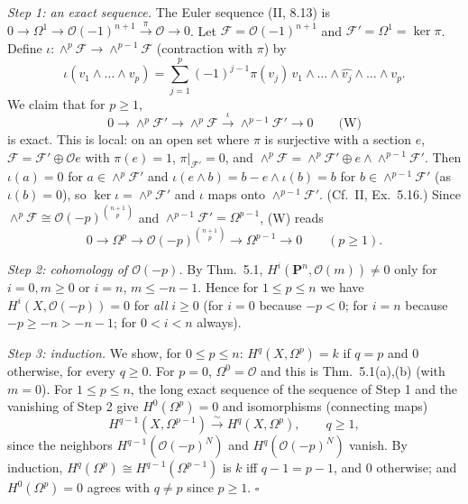 \documentclass[11pt]{article}
\begin{document}
\emph{Step 1: an exact sequence.} The Euler sequence (II, 8.13) is $0\to\Omega^1\to\mathcal O(-1)^{n+1}\xrightarrow{\pi}\mathcal O\to0$. Let $\mathcal F=\mathcal O(-1)^{n+1}$ and $\mathcal F'=\Omega^1=\ker\pi$. Define $\iota\colon\wedge^p\mathcal F\to\wedge^{p-1}\mathcal F$ (contraction with $\pi$) by
\[
\iota(v_1\wedge\dots\wedge v_p)=\sum_{j=1}^p(-1)^{j-1}\pi(v_j)\,v_1\wedge\dots\wedge\widehat{v_j}\wedge\dots\wedge v_p .
\]
We claim that for $p\ge1$,
\[
0\to\wedge^p\mathcal F'\to\wedge^p\mathcal F\xrightarrow{\ \iota\ }\wedge^{p-1}\mathcal F'\to0\qquad\text{(W)}
\]
is exact. This is local: on an open set where $\pi$ is surjective with a section $e$, $\mathcal F=\mathcal F'\oplus\mathcal O e$ with $\pi(e)=1$, $\pi|_{\mathcal F'}=0$, and $\wedge^p\mathcal F=\wedge^p\mathcal F'\oplus e\wedge\wedge^{p-1}\mathcal F'$. Then $\iota(a)=0$ for $a\in\wedge^p\mathcal F'$ and $\iota(e\wedge b)=b-e\wedge\iota(b)=b$ for $b\in\wedge^{p-1}\mathcal F'$ (as $\iota(b)=0$), so $\ker\iota=\wedge^p\mathcal F'$ and $\iota$ maps onto $\wedge^{p-1}\mathcal F'$. (Cf.\ II, Ex.~5.16.) Since $\wedge^p\mathcal F\cong\mathcal O(-p)^{\binom{n+1}{p}}$ and $\wedge^{p-1}\mathcal F'=\Omega^{p-1}$, (W) reads
\[
0\to\Omega^p\to\mathcal O(-p)^{\binom{n+1}{p}}\to\Omega^{p-1}\to0\qquad(p\ge1).
\]

\emph{Step 2: cohomology of $\mathcal O(-p)$.} By Thm.~5.1, $H^i(\mathbf P^n,\mathcal O(m))\neq0$ only for $i=0,m\ge0$ or $i=n$, $m\le-n-1$. Hence for $1\le p\le n$ we have $H^i(X,\mathcal O(-p))=0$ for \emph{all} $i\ge0$ (for $i=0$ because $-p<0$; for $i=n$ because $-p\ge-n>-n-1$; for $0<i<n$ always).

\emph{Step 3: induction.} We show, for $0\le p\le n$: $H^q(X,\Omega^p)=k$ if $q=p$ and $0$ otherwise, for every $q\ge0$. For $p=0$, $\Omega^0=\mathcal O$ and this is Thm.~5.1(a),(b) (with $m=0$). For $1\le p\le n$, the long exact sequence of the sequence of Step 1 and the vanishing of Step 2 give $H^0(\Omega^p)=0$ and isomorphisms (connecting maps)
\[
H^{q-1}(X,\Omega^{p-1})\xrightarrow{\sim}H^q(X,\Omega^p),\qquad q\ge1,
\]
since the neighbors $H^{q-1}(\mathcal O(-p)^N)$ and $H^q(\mathcal O(-p)^N)$ vanish. By induction, $H^q(\Omega^p)\cong H^{q-1}(\Omega^{p-1})$ is $k$ iff $q-1=p-1$, and $0$ otherwise; and $H^0(\Omega^p)=0$ agrees with $q\neq p$ since $p\ge1$. \hfill$\square$
\end{document}
